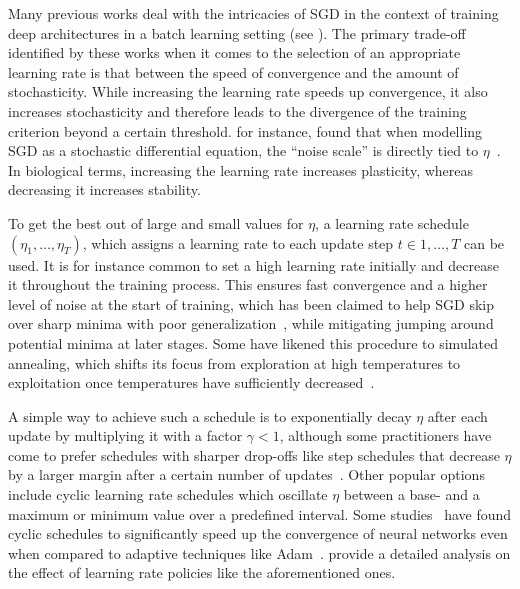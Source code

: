 \documentclass[letterpaper]{article} %
\begin{document}
Many previous works deal with the intricacies of SGD in the context of training deep architectures in a batch learning setting (see \citet{bengioPracticalRecommendationsGradientbased2012,bottouStochasticGradientDescent2012,Goodfellow-et-al-2016}).
The primary trade-off identified by these works when it comes to  the selection of an appropriate learning rate is that between the speed of convergence and the amount of stochasticity.
While increasing the learning rate speeds up convergence, it also increases stochasticity and therefore leads to the divergence of the training criterion beyond a certain threshold.
 for instance, found that when modelling SGD as a stochastic differential equation, the “noise scale” is directly tied to $\eta$~\cite{smithBayesianPerspectiveGeneralization2018}.
In biological terms, increasing the learning rate increases plasticity, whereas decreasing it increases stability. %


To get the best out of large and small values for $\eta$, a learning rate schedule $(\eta_1,\ldots,\eta_T)$, which assigns a learning rate to each update step $t \in 1,\ldots,T$ can be used.
It is for instance common to set a high learning rate initially and decrease it throughout the training process.
This ensures fast convergence and a higher level of noise at the start of training, which has been claimed to help SGD skip over sharp minima with poor generalization~\cite{hochreiterFlatMinima1997,chaudhariEntropySGDBiasingGradient2017}, while mitigating jumping around potential minima at later stages.
Some have likened this procedure to simulated annealing, which shifts its focus from exploration at high temperatures to exploitation once temperatures have sufficiently decreased~\cite{smithDonDecayLearning2018}.

A simple way to achieve such a schedule is to exponentially decay $\eta$ after each update by multiplying it with a factor $\gamma < 1$, although some practitioners have come to prefer schedules with sharper drop-offs like step schedules that decrease $\eta$ by a larger margin after a certain number of updates~\cite{smithDonDecayLearning2018}.
Other popular options include cyclic learning rate schedules which oscillate  $\eta$ between a base- and a maximum or minimum value over a predefined interval.
Some studies~\cite{smithCyclicalLearningRates2017, smithSuperConvergenceVeryFast2018a} have found cyclic schedules to significantly speed up the convergence of neural networks even when compared to adaptive techniques like Adam~\cite{kingmaAdamMethodStochastic2017b}.
 provide a detailed analysis on the effect of learning rate policies like the aforementioned ones.
\end{document}
